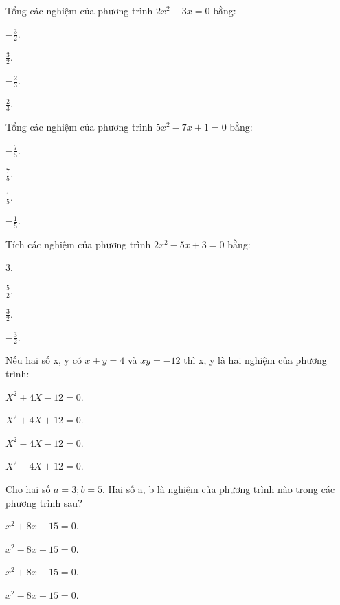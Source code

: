 \documentclass[%
    fontsize=12pt,%
    chapterprefix=false,%
    open=right,%
    twoside=false,%
    numbers=noenddot,%
    headings=optiontohead,%
    final,%
    DIV=15,%
    parskip=half %
]{scrbook}
\begin{document}
\begin{tracnghiem}
\item Tổng các nghiệm của phương trình $ 2x^2 - 3x = 0 $ bằng:
\begin{options}
  \item $ -\frac{3}{2}. $
  \item $ \frac{3}{2}. $
  \item $ -\frac{2}{3}. $
  \item $ \frac{2}{3}. $
\end{options}

\item Tổng các nghiệm của phương trình $ 5x^2 - 7x + 1 = 0 $ bằng:
\begin{options}
  \item $ -\frac{7}{5}. $
  \item $ \frac{7}{5}. $
  \item $ \frac{1}{5}. $
  \item $ -\frac{1}{5}. $
\end{options}

\item Tích các nghiệm của phương trình $ 2x^2 - 5x + 3 = 0 $ bằng:
\begin{options}
  \item 3.
  \item $ \frac{5}{2}. $
  \item $ \frac{3}{2}. $
  \item $ -\frac{3}{2}. $
\end{options}

\item Nếu hai số x, y có $ x + y = 4 $ và $ xy = -12 $ thì x, y là hai nghiệm của phương trình:
\begin{options}
  \item $ X^2 + 4X - 12 = 0. $
  \item $ X^2 + 4X + 12 = 0. $
  \item $ X^2 - 4X - 12 = 0. $
  \item $ X^2 - 4X + 12 = 0. $
\end{options}

\item Cho hai số $ a = 3; b = 5 $. Hai số a, b là nghiệm của phương trình nào trong các phương trình sau?
\begin{options}
  \item $ x^2 + 8x - 15 = 0. $
  \item $ x^2 - 8x - 15 = 0. $
  \item $ x^2 + 8x + 15 = 0. $
  \item $ x^2 - 8x + 15 = 0. $
\end{options}


\end{tracnghiem}
\end{document}
